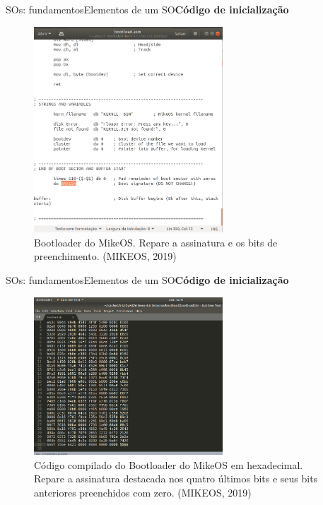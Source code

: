 \documentclass{beamer}
\begin{document}
        \begin{frame}{SOs: fundamentos}{Elementos de um SO}{\bfseries{Código de inicialização}}
          \begin{figure}[!htb]
            \centering
            \includegraphics[width=200pt, keepaspectratio=true]{MikeOS/bootLoaderMikeOS_asm.png}
            \caption{Bootloader do MikeOS. Repare a assinatura e os bits de preenchimento. (MIKEOS, 2019)}
            \label{bootLoaderMikeOS_asm}
          \end{figure}
        \end{frame}

        \begin{frame}{SOs: fundamentos}{Elementos de um SO}{\bfseries{Código de inicialização}}
          \begin{figure}[!htb]
            \centering
            \includegraphics[width=200pt, keepaspectratio=true]{MikeOS/bootloaderMikeOS_bin.png}
            \caption{Código compilado do Bootloader do MikeOS em hexadecimal. Repare a assinatura destacada nos quatro últimos bits e seus bits anteriores preenchidos com zero. (MIKEOS, 2019)}
            \label{bootloaderMikeOS_bin}
          \end{figure}
        \end{frame}
\end{document}
